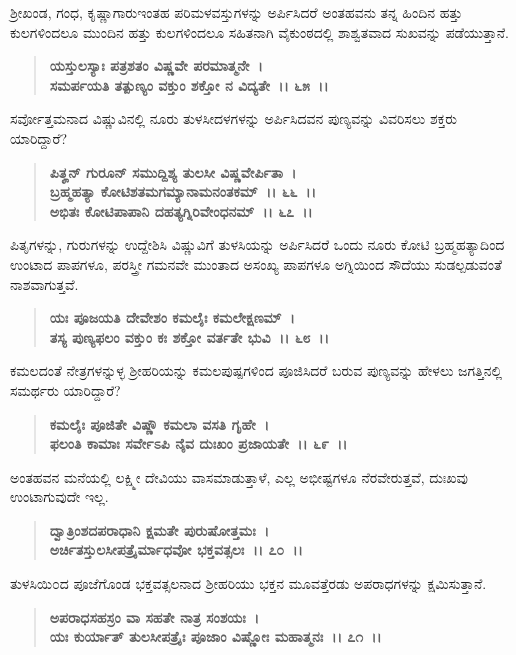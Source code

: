 ಶ‍್ರೀಖಂಡ, ಗಂಧ, ಕೃಷ್ಣಾಗಾರುಇಂತಹ ಪರಿಮಳವಸ್ತುಗಳನ್ನು ಅರ್ಪಿಸಿದರೆ ಅಂತಹವನು ತನ್ನ ಹಿಂದಿನ ಹತ್ತು ಕುಲಗಳಿಂದಲೂ ಮುಂದಿನ ಹತ್ತು ಕುಲಗಳಿಂದಲೂ ಸಹಿತನಾಗಿ ವೈಕುಂಠದಲ್ಲಿ ಶಾಶ್ವತವಾದ ಸುಖವನ್ನು ಪಡೆಯುತ್ತಾನೆ.

\begin{verse}
\textbf{ಯಸ್ತುಲಸ್ಯಾಃ ಪತ್ರಶತಂ ವಿಷ್ಣವೇ ಪರಮಾತ್ಮನೇ~।}\\\textbf{ಸಮರ್ಪಯತಿ ತತ್ಪುಣ್ಯಂ ವಕ್ತುಂ ಶಕ್ತೋ ನ ವಿದ್ಯತೇ~।। ೬೫~।।}
\end{verse}

ಸರ್ವೋತ್ತಮನಾದ ವಿಷ್ಣುವಿನಲ್ಲಿ ನೂರು ತುಳಸೀದಳಗಳನ್ನು ಅರ್ಪಿಸಿದವನ ಪುಣ್ಯವನ್ನು ವಿವರಿಸಲು ಶಕ್ತರು ಯಾರಿದ್ದಾರೆ?

\begin{verse}
\textbf{ಪಿತೄನ್ ಗುರೂನ್ ಸಮುದ್ದಿಶ್ಯ ತುಲಸೀ ವಿಷ್ಣವೇರ್ಪಿತಾ~।}\\\textbf{ಬ್ರಹ್ಮಹತ್ಯಾ ಕೋಟಿಶತಮಗಮ್ಯಾನಾಮನಂತಕಮ್~।। ೬೬~।।}\\\textbf{ಅಭಿತಃ ಕೋಟಿಪಾಪಾನಿ ದಹತ್ಯಗ್ನಿರಿವೇಂಧನಮ್~।। ೬೭~।।}
\end{verse}

ಪಿತೃಗಳನ್ನು, ಗುರುಗಳನ್ನು ಉದ್ದೇಶಿಸಿ ವಿಷ್ಣುವಿಗೆ ತುಳಸಿಯನ್ನು ಅರ್ಪಿಸಿದರೆ ಒಂದು ನೂರು ಕೋಟಿ ಬ್ರಹ್ಮಹತ್ಯಾದಿಂದ ಉಂಟಾದ ಪಾಪಗಳೂ, ಪರಸ್ತ್ರೀ ಗಮನವೇ ಮುಂತಾದ ಅಸಂಖ್ಯ ಪಾಪಗಳೂ ಅಗ್ನಿಯಿಂದ ಸೌದೆಯು ಸುಡಲ್ಪಡುವಂತೆ ನಾಶವಾಗುತ್ತವೆ.

\begin{verse}
\textbf{ಯಃ ಪೂಜಯತಿ ದೇವೇಶಂ ಕಮಲೈಃ ಕಮಲೇಕ್ಷಣಮ್~।}\\\textbf{ತಸ್ಯ ಪುಣ್ಯಫಲಂ ವಕ್ತುಂ ಕಃ ಶಕ್ತೋ ವರ್ತತೇ ಭುವಿ~।। ೬೮~।।}
\end{verse}

ಕಮಲದಂತೆ ನೇತ್ರಗಳನ್ನುಳ್ಳ ಶ‍್ರೀಹರಿಯನ್ನು ಕಮಲಪುಷ್ಪಗಳಿಂದ ಪೂಜಿಸಿದರೆ ಬರುವ ಪುಣ್ಯವನ್ನು ಹೇಳಲು ಜಗತ್ತಿನಲ್ಲಿ ಸಮರ್ಥರು ಯಾರಿದ್ದಾರೆ?

\begin{verse}
\textbf{ಕಮಲೈಃ ಪೂಜಿತೇ ವಿಷ್ಣೌ ಕಮಲಾ ವಸತಿ ಗೃಹೇ~।}\\\textbf{ಫಲಂತಿ ಕಾಮಾಃ ಸರ್ವೇಽಪಿ ನೈವ ದುಃಖಂ ಪ್ರಜಾಯತೇ~।। ೬೯~।।}
\end{verse}

ಅಂತಹವನ ಮನೆಯಲ್ಲಿ ಲಕ್ಷ್ಮೀ ದೇವಿಯು ವಾಸಮಾಡುತ್ತಾಳೆ, ಎಲ್ಲ ಅಭೀಷ್ಟಗಳೂ ನೆರವೇರುತ್ತವೆ, ದುಃಖವು ಉಂಟಾಗುವುದೇ ಇಲ್ಲ.

\begin{verse}
\textbf{ದ್ವಾತ್ರಿಂಶದಪರಾಧಾನಿ ಕ್ಷಮತೇ ಪುರುಷೋತ್ತಮಃ~।}\\\textbf{ಅರ್ಚಿತಸ್ತುಲಸೀಪತ್ರೈರ್ಮಾಧವೋ ಭಕ್ತವತ್ಸಲಃ~।। ೭೦~।।}
\end{verse}

ತುಳಸಿಯಿ೦ದ ಪೂಜೆಗೊಂಡ ಭಕ್ತವತ್ಸಲನಾದ ಶ‍್ರೀಹರಿಯು ಭಕ್ತನ ಮೂವತ್ತೆರಡು ಅಪರಾಧಗಳನ್ನು ಕ್ಷಮಿಸುತ್ತಾನೆ.

\begin{verse}
\textbf{ಅಪರಾಧಸಹಸ್ರಂ ವಾ ಸಹತೇ ನಾತ್ರ ಸಂಶಯಃ~।}\\\textbf{ಯಃ ಕುರ್ಯಾತ್ ತುಲಸೀಪತ್ರೈಃ ಪೂಜಾಂ ವಿಷ್ಣೋಃ ಮಹಾತ್ಮನಃ~।। ೭೧~।।}
\end{verse}

